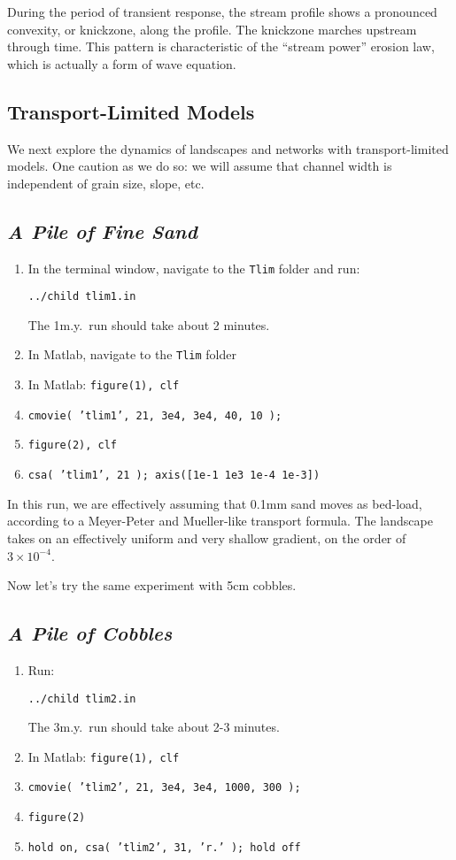 \documentclass[12pt]{amsart}
\begin{document}
\noindent
During the period of transient response, the stream profile shows a pronounced convexity, or knickzone, along the profile. The knickzone marches upstream through time. This pattern is characteristic of the ``stream power'' erosion law, which is actually a form of wave equation.

\subsection{Transport-Limited Models}

We next explore the dynamics of landscapes and networks with transport-limited models. One caution as we do so: we will assume that channel width is independent of grain size, slope, etc.

\subsection*{\em A Pile of Fine Sand}

{ \em
\begin{enumerate}
\item
In the terminal window, navigate to the {\tt Tlim} folder and run:

{\tt ../child tlim1.in}

The 1m.y.\ run should take about 2 minutes.
\item
In Matlab, navigate to the {\tt Tlim} folder
\item
In Matlab: {\tt figure(1), clf}
\item
{\tt cmovie( 'tlim1', 21, 3e4, 3e4, 40, 10 );}
\item
{\tt figure(2), clf}
\item
{\tt csa( 'tlim1', 21 ); axis([1e-1 1e3 1e-4 1e-3])}
\end{enumerate}
}

\noindent
In this run, we are effectively assuming that 0.1mm sand moves as bed-load, according to a Meyer-Peter and Mueller-like transport formula. The landscape takes on an effectively uniform and very shallow gradient, on the order of $3\times 10^{-4}$.

Now let's try the same experiment with 5cm cobbles.

\subsection*{\em A Pile of Cobbles}

{ \em
\begin{enumerate}
\item
Run:

{\tt ../child tlim2.in}

The 3m.y.\ run should take about 2-3 minutes.
\item
In Matlab: {\tt figure(1), clf}
\item
{\tt cmovie( 'tlim2', 21, 3e4, 3e4, 1000, 300 );}
\item
{\tt figure(2)}
\item
{\tt hold on, csa( 'tlim2', 31, 'r.' ); hold off}
\end{enumerate}
}
\end{document}
